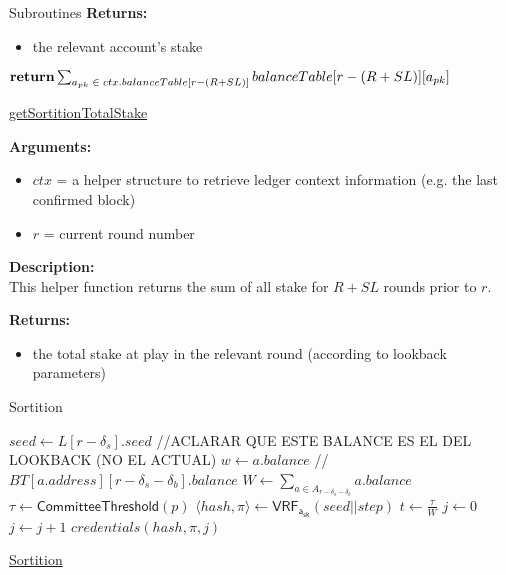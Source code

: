 \documentclass[10pt,a4paper]{article}
\begin{document}
\begin{section}{Subroutines}
\noindent \textbf{Returns:}
\begin{itemize}
    \item the relevant account's stake
  \end{itemize}




\begin{algorithm}[H]\label{algo:get-sortition-W}
    \begin{algorithmic}[1]
        
        $\Return \sum_{a_{pk}\;\in\;ctx.balanceTable[r - (R + SL)]}{balanceTable[r - (R + SL)][a_{pk}]}$

        \EndFunction
    \end{algorithmic}
    \caption{\underline{getSortitionTotalStake}}
\end{algorithm}

\noindent \textbf{Arguments:}
\begin{itemize}
    \item $ctx$ = a helper structure to retrieve ledger context information (e.g. the last confirmed block)
    \item $r$ = current round number
  \end{itemize}


\noindent \textbf{Description:}\\
This helper function returns the sum of all stake for $R + SL$ rounds prior to $r$.

\noindent \textbf{Returns:}
\begin{itemize}
    \item the total stake at play in the relevant round (according to lookback parameters)
  \end{itemize}


\begin{algorithm}[H]
    \caption{Sortition}
    \label{algo:sortition}
    \begin{algorithmic}[1]
        \State $seed \gets L[r - \delta_s].seed$
        //ACLARAR QUE ESTE BALANCE ES EL DEL LOOKBACK (NO EL ACTUAL)
        \State $w \gets a.balance$ //$BT[a.address][r-\delta_s-\delta_b].balance$
        \State $W \gets \sum_{a \in A_{r-\delta_s-\delta_b}}a.balance$
        \State $\tau \gets \mathsf{CommitteeThreshold}(p)$
        \State $ \langle hash, \pi \rangle \gets \mathsf{VRF_{a_{sk}}}(seed||step)$
        \State $t \gets \frac{\tau}{W}$
        \State $j \gets 0$
        \While{$\frac{hash}{2^{hashlen}}\notin [ \sum_{k=0}^j\mathsf{B}(k;w,t), \sum_{k=0}^{j+1}\mathsf{B}(k;w,t))$}
            \State $j \gets j+1$
        \EndWhile
        \Return $credentials(hash, \pi, j)$
    \EndFunction
    \end{algorithmic}
    \caption{\underline{Sortition}}
\end{algorithm}



\end{section}
\end{document}

